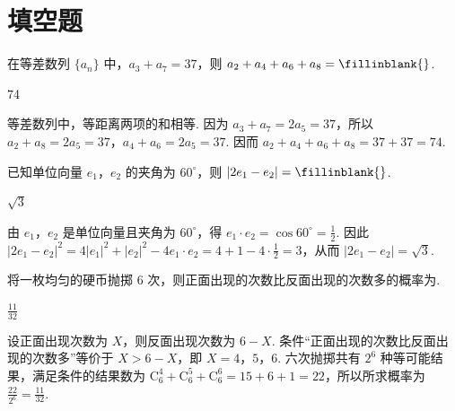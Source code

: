 \section{填空题}

\begin{problem}
在等差数列 \(\{a_{n}\}\) 中，\(a_{3} + a_{7} = 37\)，则 \(a_{2} + a_{4} + a_{6} + a_{8} =\fillinblank{}\).
\begin{answer}
74
\end{answer}

\begin{solution}
等差数列中，等距离两项的和相等. 因为 \(a_3+a_7=2a_5=37\)，所以 \(a_2+a_8=2a_5=37\)，\(a_4+a_6=2a_5=37\). 因而 \(a_2+a_4+a_6+a_8=37+37=74\).
\end{solution}
\end{problem}

\begin{problem}
已知单位向量 \(e_1\)，\(e_2\) 的夹角为 \(60^\circ\)，则 \(|2e_1 - e_2| =\fillinblank{}\).
\begin{answer}
\(\sqrt{3}\)
\end{answer}

\begin{solution}
由 \(e_1\)，\(e_2\) 是单位向量且夹角为 \(60^\circ\)，得 \(e_1\cdot e_2=\cos60^\circ=\frac{1}{2}\). 因此
\(\lvert2e_1-e_2\rvert^2=4\lvert e_1\rvert^2+\lvert e_2\rvert^2-4e_1\cdot e_2=4+1-4\cdot\frac{1}{2}=3\)，从而 \(\lvert2e_1-e_2\rvert=\sqrt{3}\).
\end{solution}
\end{problem}

\begin{problem}
将一枚均匀的硬币抛掷 6 次，则正面出现的次数比反面出现的次数多的概率为\fillinblank{}.
\begin{answer}
\(\frac{11}{32}\)
\end{answer}

\begin{solution}
设正面出现次数为 \(X\)，则反面出现次数为 \(6-X\). 条件“正面出现的次数比反面出现的次数多”等价于 \(X>6-X\)，即 \(X=4\)，\(5\)，\(6\). 六次抛掷共有 \(2^6\) 种等可能结果，满足条件的结果数为 \(\mathrm C_6^4+\mathrm C_6^5+\mathrm C_6^6=15+6+1=22\)，所以所求概率为 \(\frac{22}{2^6}=\frac{11}{32}\).
\end{solution}
\end{problem}

